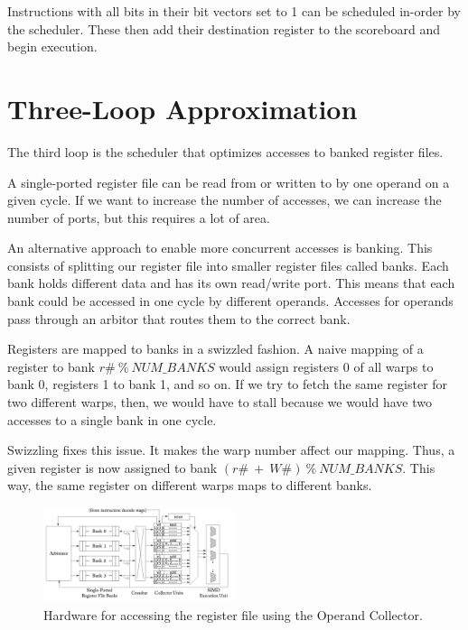 Instructions with all bits in their bit vectors set to 1 can be scheduled in-order by the scheduler.
These then add their destination register to the scoreboard and begin execution.


\section{Three-Loop Approximation}

The third loop is the scheduler that optimizes accesses to banked register files.

A single-ported register file can be read from or written to by one operand on a given cycle.
If we want to increase the number of accesses, we can increase the number of ports, but
this requires a lot of area.

An alternative approach to enable more concurrent accesses is banking. This consists of splitting
our register file into smaller register files called banks. Each bank holds different
data and has its own read/write port. This means that each bank could be accessed in one
cycle by different operands. Accesses for operands pass through an arbitor that routes
them to the correct bank.

Registers are mapped to banks in a swizzled fashion. A naive mapping of a register to bank $r\# \ \% \ NUM\_BANKS$ would
assign registers 0 of all warps to bank 0, registers 1 to bank 1, and so on. If we try to fetch
the same register for two different warps, then, we would have to stall because we would have
two accesses to a single bank in one cycle.

Swizzling fixes this issue. It makes the warp number affect our mapping. Thus, a given register is now
assigned to bank $(r\# \ + \ W\#) \ \% \ NUM\_BANKS$.
This way, the same register on different warps maps to different banks.

\begin{figure}[h]
    \centering
    \includegraphics[width=0.5\textwidth]{assets/operand.png}
    \caption{Hardware for accessing the register file using the Operand Collector.}
    \label{fig:opcoll}
\end{figure}

